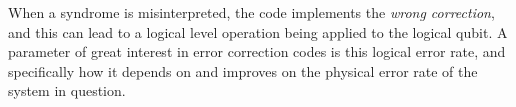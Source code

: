When a syndrome is misinterpreted, the code implements the \textit{wrong
  correction}, and this can lead to a logical level operation being applied to
the logical qubit. A parameter of great interest in error correction codes is
this logical error rate, and specifically how it depends on and improves on the
physical error rate of the system in question. 





